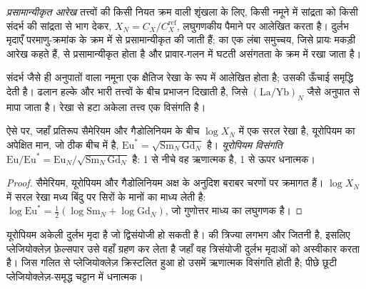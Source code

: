 \begin{definition}[प्रसामान्यीकृत आरेख]\label{def:b2:elements-in-the-earth:normalised}
\emph{प्रसामान्यीकृत आरेख} तत्त्वों की किसी
नियत क्रम वाली शृंखला के लिए, किसी नमूने में सांद्रता को किसी संदर्भ की सांद्रता से
भाग देकर, $X_N = C_X/C_X^{\mathrm{ref}}$, लघुगणकीय पैमाने पर आलेखित करता है। दुर्लभ मृदाएँ
परमाणु-क्रमांक के क्रम में  से प्रसामान्यीकृत की जाती हैं;  का
एक लंबा समुच्चय, जिसे प्रायः मकड़ी आरेख कहते हैं,  से प्रसामान्यीकृत होता है
और प्रावार-गलन में घटती असंगतता के क्रम में रखा जाता है।
\end{definition}

संदर्भ जैसे ही अनुपातों वाला नमूना एक क्षैतिज रेखा के रूप में आलेखित होता है;
उसकी ऊँचाई समृद्धि देती है। ढलान हल्के और भारी तत्त्वों के बीच
प्रभाजन दिखाती है, जिसे $(\mathrm{La}/\mathrm{Yb})_N$ जैसे अनुपात से मापा जाता है।
रेखा से हटा अकेला तत्त्व एक विसंगति है।

\begin{proposition}[यूरोपियम विसंगति]\label{prop:b2:elements-in-the-earth:normalised}
ऐसे  पर, जहाँ प्रतिरूप सैमेरियम और गैडोलिनियम के बीच
$\log X_N$ में एक सरल रेखा है, यूरोपियम का अपेक्षित मान, जो
ठीक बीच में है, $\mathrm{Eu}^* = \sqrt{\mathrm{Sm}_N\,\mathrm{Gd}_N}$ है।
\emph{यूरोपियम विसंगति}
$\mathrm{Eu}/\mathrm{Eu}^* = \mathrm{Eu}_N/\sqrt{\mathrm{Sm}_N\,\mathrm{Gd}_N}$ है:
1 से नीचे वह ऋणात्मक है, 1 से ऊपर धनात्मक।
\end{proposition}

\begin{proof}
सैमेरियम, यूरोपियम और गैडोलिनियम अक्ष के अनुदिश बराबर चरणों पर क्रमागत हैं।
$\log X_N$ में सरल रेखा मध्य बिंदु पर सिरों के मानों का माध्य लेती है:
$\log \mathrm{Eu}^* = \tfrac12(\log \mathrm{Sm}_N + \log \mathrm{Gd}_N)$, जो
गुणोत्तर माध्य का लघुगणक है।
\end{proof}

यूरोपियम अकेली दुर्लभ मृदा है जो द्विसंयोजी हो सकती है।  की त्रिज्या लगभग
 और  जितनी है, इसलिए प्लेजियोक्लेज़ फ़ेल्सपार उसे वहाँ ग्रहण कर लेता है जहाँ वह
त्रिसंयोजी दुर्लभ मृदाओं को अस्वीकार करता है। जिस गलित से प्लेजियोक्लेज़ क्रिस्टलित हुआ हो
उसमें ऋणात्मक विसंगति होती है; पीछे छूटी प्लेजियोक्लेज़-समृद्ध चट्टान में धनात्मक।

